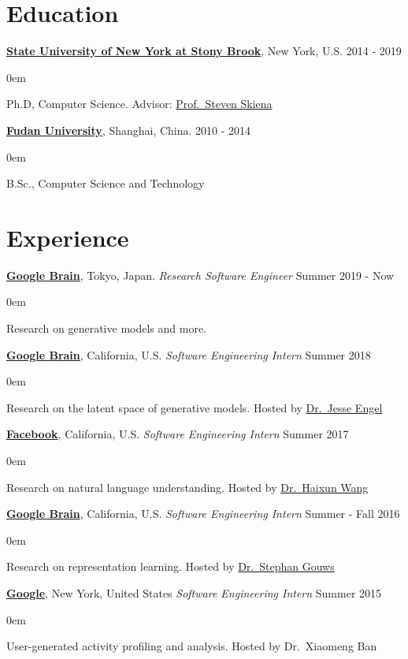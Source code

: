 \documentclass[line,margin]{cv}
\makeatletter
\newenvironment{block}
{
	\begin{addmargin}[2em]{0em}%
}
{
	\end{addmargin}
}
\newcommand{\SUNY}{\href{http://www.stonybrook.edu/}{State University of New York at Stony Brook}}
\newcommand{\Google}{\href{https://www.google.com/}{Google}}
\newcommand{\GoogleBrain}{\href{http://research.google.com/teams/brain/}{Google Brain}}
\newcommand{\Facebook}{\href{https://www.facebook.com/}{Facebook}}
\newcommand{\Fudan}{\href{http://www.fudan.edu.cn/englishnew/}{Fudan University}}
\newcommand{\MyMail}{\href{mailto:alan.yt.tian@gmail.com}{alan.yt.tian@gmail.com}}
\newcommand{\Haixun}{\href{http://haixun.olidu.com/}{Dr.\ Haixun Wang}}
\newcommand{\Skiena}{\href{https://www3.cs.stonybrook.edu/~skiena/}{Prof.\ Steven Skiena}}
\newcommand{\sgouws}{\href{http://research.google.com/pubs/StephanGouws.html}{Dr.\ Stephan Gouws}}
\newcommand{\jesseengel}{\href{https://ai.google/research/people/JesseEngel}{Dr.\ Jesse Engel}}
\makeatother
\begin{document}

\address{\textit{E-mail:} \MyMail}

\begin{resume}

\section{Education}

	{\bf \SUNY}, New York, U.S. \hfill 2014 - 2019
	\begin{block}
		Ph.D, Computer Science. Advisor: \Skiena
	\end{block}

	{\bf \Fudan}, Shanghai, China. \hfill 2010 - 2014

	\begin{block}
		B.Sc., Computer Science and Technology 
	\end{block}

\section{Experience}

	{\bf \GoogleBrain}, Tokyo, Japan. {\itshape Research Software Engineer} \hfill Summer 2019 - Now
	\begin{block}
		Research on generative models and more.
	\end{block}

	{\bf \GoogleBrain}, California, U.S. {\itshape Software Engineering Intern} \hfill Summer 2018
	\begin{block}
		Research on the latent space of generative models. Hosted by \jesseengel
	\end{block}

	{\bf \Facebook}, California, U.S. {\itshape Software Engineering Intern} \hfill Summer 2017
	\begin{block}
		Research on natural language understanding. Hosted by \Haixun
	\end{block}

	{\bf \GoogleBrain}, California, U.S. {\itshape Software Engineering Intern} \hfill Summer - Fall 2016
	\begin{block}
		Research on representation learning. Hosted by \sgouws
	\end{block}

	{\bf \Google}, New York, United States {\itshape Software Engineering Intern} \hfill Summer 2015
	\begin{block}
		User-generated activity profiling and analysis. Hosted by Dr.\ Xiaomeng Ban
	\end{block}


\end{resume}
\end{document}
